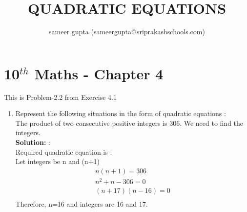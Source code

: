 \documentclass[10pt]{article}
\title{QUADRATIC EQUATIONS}
\author{sameer gupta (sameergupta@sriprakashschools.com)}
\newcommand{\solution}{\noindent \textbf{Solution: }}
\begin{document}
\maketitle
\section*{10$^{th}$ Maths - Chapter 4}
This is Problem-2.2 from Exercise 4.1
\begin{enumerate}
\item  Represent the following situations in the form of quadratic equations :\\
The product of two consecutive positive integers is 306. We need to find the
integers.\\
\solution:\\Required quadratic equation is :\\
Let integers be n and (n+1)\\
 \begin{align}
{n(n+1)=306}\\
{n^2+n-306=0}\\
{(n+17)(n-16)=0}\\
 \end{align}
Therefore, n=16 and integers are 16 and 17.

	

\end{enumerate}
\end{document}

